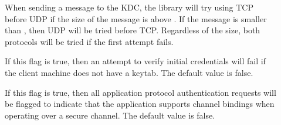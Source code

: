 \documentclass[letterpaper,10pt,english]{sphinxmanual}
\begin{document}
\begin{description}
\item[{}] \leavevmode
\sphinxAtStartPar
When sending a message to the KDC, the library will try using TCP
before UDP if the size of the message is above
.  If the message is smaller than
, then UDP will be tried before TCP.
Regardless of the size, both protocols will be tried if the first
attempt fails.

\item[{}] \leavevmode
\sphinxAtStartPar
If this flag is true, then an attempt to verify initial
credentials will fail if the client machine does not have a
keytab.  The default value is false.

\item[{}] \leavevmode
\sphinxAtStartPar
If this flag is true, then all application protocol authentication
requests will be flagged to indicate that the application supports
channel bindings when operating over a secure channel.  The
default value is false.

\end{description}
\end{document}
